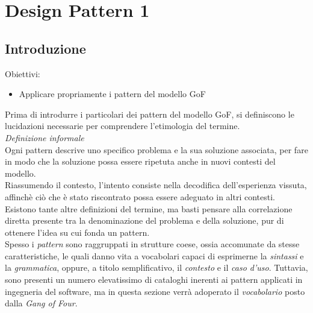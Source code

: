 \documentclass{article}
\begin{document}
\pagestyle{empty}
\section*{Design Pattern 1}
\large

\subsection*{Introduzione}
\large
Obiettivi:
\begin{itemize}
    \renewcommand{\labelitemi}{-}
    \itemsep0em
    \item Applicare propriamente i pattern del modello GoF 
\end{itemize}
Prima di introdurre i particolari dei pattern del modello GoF, si definiscono le lucidazioni necessarie per comprendere l'etimologia del termine.\vspace*{14pt}\\
\textit{Definizione informale}\\
Ogni pattern descrive uno specifico problema e la sua soluzione associata, per fare in modo che la soluzione possa essere ripetuta anche in nuovi contesti del modello.\vspace*{14pt}\\
Riassumendo il contesto, l'intento consiste nella decodifica dell'esperienza vissuta, affinchè ciò che è stato riscontrato possa essere adeguato in altri contesti. Esistono tante altre definizioni del termine, ma basti pensare alla correlazione diretta presente tra la denominazione del problema e della soluzione, pur di ottenere l'idea su cui fonda un pattern.\vspace*{14pt}\\
Spesso i \textit{pattern} sono raggruppati in strutture coese, ossia accomunate da stesse caratteristiche, le quali danno vita a vocabolari capaci di esprimerne la \textit{sintassi} e la \textit{grammatica}, oppure, a titolo semplificativo, il \textit{contesto} e il \textit{caso d'uso}. Tuttavia, sono presenti un numero elevatissimo di cataloghi inerenti ai pattern applicati in ingegneria del software, ma in questa sezione verrà adoperato il \textit{vocabolario} posto dalla \textit{Gang of Four}.
\end{document}
